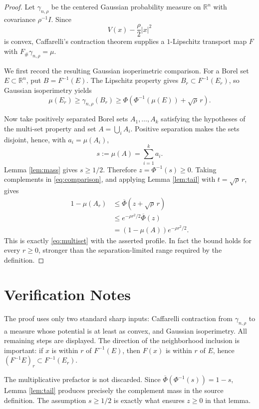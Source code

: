 \documentclass[11pt]{amsart}
\newcommand{\R}{\mathbb R}
\newcommand{\gammaRho}{\gamma_{n,\rho}}
\begin{document}
\begin{proof}
Let $\gammaRho$ be the centered Gaussian probability measure on $\R^n$
with covariance $\rho^{-1}I$.  Since
\[
 V(x)-\frac\rho2|x|^2
\]
is convex, Caffarelli's contraction theorem \cite{Caffarelli} supplies a
$1$-Lipschitz transport map $F$ with
$F_\#\gammaRho=\mu$.

We first record the resulting Gaussian isoperimetric comparison.  For a
Borel set $E\subset\R^n$, put $B=F^{-1}(E)$.  The Lipschitz property gives
$B_r\subset F^{-1}(E_r)$, so Gaussian isoperimetry yields
\begin{equation}\label{eq:comparison}
 \mu(E_r)
 \geq \gammaRho(B_r)
 \geq
 \Phi\!\left(\Phi^{-1}(\mu(E))+\sqrt\rho\,r\right).
\end{equation}

Now take positively separated Borel sets $A_1,\ldots,A_k$ satisfying the
hypotheses of the multi-set property and set $A=\bigcup_iA_i$.  Positive
separation makes the sets disjoint, hence, with
$a_i=\mu(A_i)$,
\[
 s:=\mu(A)=\sum_{i=1}^k a_i.
\]
Lemma \ref{lem:mass} gives $s\geq1/2$.  Therefore
$z=\Phi^{-1}(s)\geq0$.  Taking complements in
\eqref{eq:comparison}, and applying Lemma \ref{lem:tail} with
$t=\sqrt\rho\,r$, gives
\begin{align*}
 1-\mu(A_r)
 &\leq \overline\Phi(z+\sqrt\rho\,r)\\
 &\leq e^{-\rho r^2/2}\overline\Phi(z)\\
 &=(1-\mu(A))e^{-\rho r^2/2}.
\end{align*}
This is exactly \eqref{eq:multiset} with the asserted profile.  In fact the
bound holds for every $r\geq0$, stronger than the separation-limited range
required by the definition.
\end{proof}

\section*{Verification Notes}

The proof uses only two standard sharp inputs: Caffarelli contraction from
$\gammaRho$ to a measure whose potential is at least as convex, and Gaussian
isoperimetry.  All remaining steps are displayed.  The direction of the
neighborhood inclusion is important: if $x$ is within $r$ of
$F^{-1}(E)$, then $F(x)$ is within $r$ of $E$, hence
$(F^{-1}E)_r\subset F^{-1}(E_r)$.

The multiplicative prefactor is not discarded.  Since
$\overline\Phi(\Phi^{-1}(s))=1-s$, Lemma \ref{lem:tail} produces precisely
the complement mass in the source definition.  The assumption
$s\geq1/2$ is exactly what ensures $z\geq0$ in that lemma.
\end{document}
